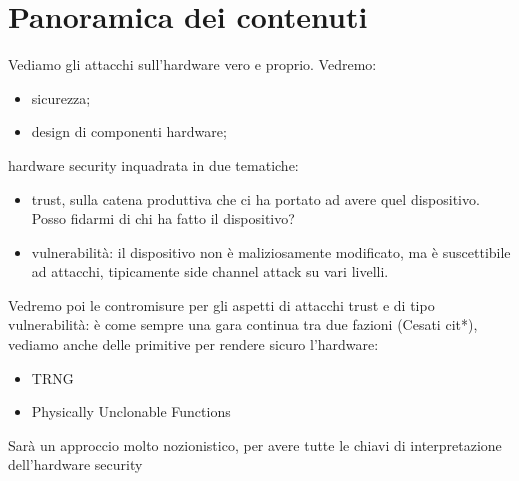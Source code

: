 \documentclass[oneside, 12pt]{extbook}
\begin{document}
\section{Panoramica dei contenuti}
Vediamo gli attacchi sull'hardware vero e proprio. Vedremo:
\begin{itemize}
	\item sicurezza;
	\item design di componenti hardware;
\end{itemize}
hardware security inquadrata in due tematiche:
\begin{itemize}
	\item trust, sulla catena produttiva che ci ha portato ad avere quel dispositivo. Posso fidarmi di chi ha fatto il dispositivo?
	\item vulnerabilità: il dispositivo non è maliziosamente modificato, ma è suscettibile ad attacchi, tipicamente side channel attack su vari livelli.
\end{itemize}
Vedremo poi le contromisure per gli aspetti di attacchi trust e di tipo vulnerabilità: è come sempre una gara continua tra due fazioni (Cesati cit*), vediamo anche delle primitive per rendere sicuro l'hardware:
\begin{itemize}
	\item TRNG
	\item Physically Unclonable Functions
\end{itemize}
Sarà un approccio molto nozionistico, per avere tutte le chiavi di interpretazione dell'hardware security
\end{document}
